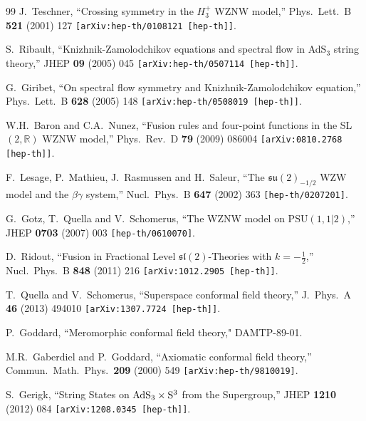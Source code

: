\documentclass[a4paper,11pt]{article}
\numberwithin{equation}{section}
\begin{document}
\begin{thebibliography}{99}
J.~Teschner,
``Crossing symmetry in the $H_3^+$ WZNW model,''
Phys.\ Lett.\ B \textbf{521} (2001) 127 %
{\tt [arXiv:hep-th/0108121 [hep-th]]}.

S.~Ribault,
``Knizhnik-Zamolodchikov equations and spectral flow in AdS$_3$ string theory,''
JHEP \textbf{09} (2005) 045
{\tt [arXiv:hep-th/0507114 [hep-th]]}.

G.~Giribet,
``On spectral flow symmetry and Knizhnik-Zamolodchikov equation,''
Phys.\ Lett.\ B \textbf{628} (2005) 148 %
{\tt [arXiv:hep-th/0508019 [hep-th]]}.

W.H.~Baron and C.A.~Nunez,
``Fusion rules and four-point functions in the SL$(2,\mathds{R})$ WZNW model,''
Phys.\ Rev.\ D \textbf{79} (2009) 086004
{\tt [arXiv:0810.2768 [hep-th]]}.

F.~Lesage, P.~Mathieu, J.~Rasmussen and H.~Saleur,
``The $\mathfrak{su}(2)_{-1/2}$ WZW model and the $\beta\gamma$ system,''
Nucl.\ Phys.\ B {\bf 647} (2002) 363
{\tt [hep-th/0207201]}.

G.~Gotz, T.~Quella and V.~Schomerus,
``The WZNW model on $\mathrm{PSU}(1,1|2)$,''
JHEP {\bf 0703} (2007) 003
{\tt [hep-th/0610070]}.

D.~Ridout,
``Fusion in Fractional Level $\mathfrak{sl}(2)$-Theories with $k=-\tfrac{1}{2}$,''
Nucl.\ Phys.\ B {\bf 848} (2011) 216
{\tt [arXiv:1012.2905 [hep-th]]}.

T.~Quella and V.~Schomerus,
``Superspace conformal field theory,''
J.\ Phys.\ A \textbf{46} (2013) 494010
{\tt [arXiv:1307.7724 [hep-th]]}.

P.~Goddard,
``Meromorphic conformal field theory," DAMTP-89-01.

M.R.~Gaberdiel and P.~Goddard,
``Axiomatic conformal field theory,''
Commun.\ Math.\ Phys.\ \textbf{209} (2000) 549
{\tt [arXiv:hep-th/9810019]}.

S.~Gerigk,
``String States on ${\rm AdS}_3 \times {\rm S}^3$ from the Supergroup,''
JHEP {\bf 1210} (2012) 084
{\tt [arXiv:1208.0345 [hep-th]]}.


\end{thebibliography}
\end{document}
